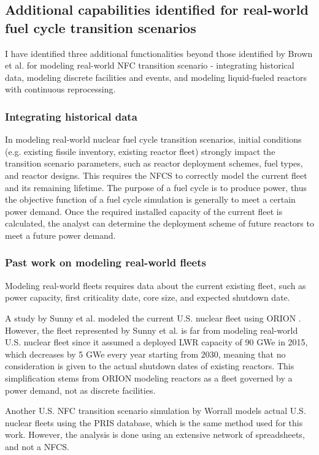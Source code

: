 \subsection{Additional capabilities identified for real-world fuel cycle transition scenarios}
I have identified three additional functionalities beyond those identified by Brown et al. \cite{brown_identification_2016}
for modeling real-world \gls{NFC} transition scenario -
integrating historical data, modeling discrete facilities and events, and modeling liquid-fueled
reactors with continuous reprocessing.


\subsubsection{Integrating historical data}
In modeling real-world nuclear fuel cycle transition scenarios, initial
conditions (e.g. existing fissile inventory, existing reactor fleet) 
strongly impact the transition scenario parameters, such as reactor deployment
schemes, fuel types, and reactor designs.
This requires the \gls{NFCS} to correctly model the current fleet and its
remaining lifetime. The purpose of a fuel cycle is to produce power, thus the objective
function of a fuel cycle simulation is generally to meet a certain power demand.
Once the required installed capacity of the current fleet is calculated,
the analyst can determine the deployment scheme of future reactors to meet a future
power demand. 

\subsubsection{Past work on modeling real-world fleets}
Modeling real-world fleets requires data about the current existing fleet,
such as power capacity, first criticality date, core size, and expected shutdown date.

A study by Sunny et al. modeled the current U.S. nuclear fleet
using ORION \cite{sunny_transition_2015}. However, the fleet represented
by Sunny et al. is far from
modeling real-world U.S. nuclear fleet since it assumed a deployed \gls{LWR} capacity
of 90 GWe in 2015, which decreases by 5 GWe every year starting from 2030,
meaning that no consideration is given to the actual shutdown dates of
existing reactors. This simplification stems from ORION modeling reactors as
a fleet governed by a power demand, not as discrete facilities.

Another U.S. \gls{NFC} transition scenario simulation by Worrall \cite{worrall_utilization_2013}
models actual U.S. nuclear fleets using the \gls{PRIS} database, which is the same
method used for this work. However, the analysis is done using an extensive
network of spreadsheets, and not a \gls{NFCS}.

